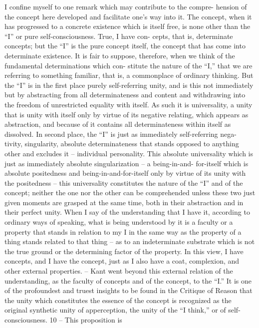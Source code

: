 I confine myself to one remark which may contribute to the compre-
hension of the concept here developed and facilitate one’s way into it. The
concept, when it has progressed to a concrete existence which is itself free,
is none other than the “I” or pure self-consciousness. True, I have con-
cepts, that is, determinate concepts; but the “I” is the pure concept itself,
the concept that has come into determinate existence. It is fair to suppose,
therefore, when we think of the fundamental determinations which con-
stitute the nature of the “I,” that we are referring to something familiar,
that is, a commonplace of ordinary thinking. But the “I” is in the first place
purely self-referring unity, and is this not immediately but by abstracting
from all determinateness and content and withdrawing into the freedom
of unrestricted equality with itself. As such it is universality, a unity that
is unity with itself only by virtue of its negative relating, which appears as
abstraction, and because of it contains all determinateness within itself as
dissolved. In second place, the “I” is just as immediately self-referring nega-
tivity, singularity, absolute determinateness that stands opposed to anything
other and excludes it – individual personality. This absolute universality
which is just as immediately absolute singularization – a being-in-and-
for-itself which is absolute positedness and being-in-and-for-itself only by
virtue of its unity with the positedness – this universality constitutes the
nature of the “I” and of the concept; neither the one nor the other can
be comprehended unless these two just given moments are grasped at the
same time, both in their abstraction and in their perfect unity.
When I say of the understanding that I have it, according to ordinary
ways of speaking, what is being understood by it is a faculty or a property
that stands in relation to my I in the same way as the property of a thing
stands related to that thing – as to an indeterminate substrate which is not
the true ground or the determining factor of the property. In this view, I
have concepts, and I have the concept, just as I also have a coat, complexion,
and other external properties. – Kant went beyond this external relation
of the understanding, as the faculty of concepts and of the concept, to
the “I.” It is one of the profoundest and truest insights to be found in
the Critique of Reason that the unity which constitutes the essence of the
concept is recognized as the original synthetic unity of apperception, the
unity of the “I think,” or of self-consciousness. 10 – This proposition is

